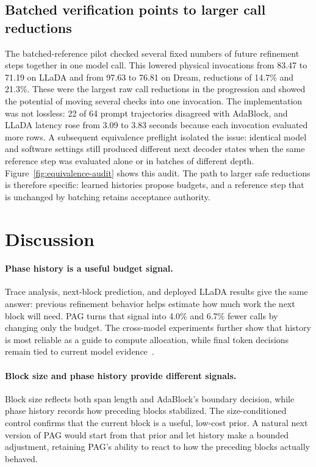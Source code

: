 \documentclass{article}
\begin{document}
\subsection{Batched verification points to larger call reductions}

The batched-reference pilot checked several fixed numbers of future refinement steps together in one model call. This lowered physical invocations from 83.47 to 71.19 on LLaDA and from 97.63 to 76.81 on Dream, reductions of 14.7\% and 21.3\%. These were the largest raw call reductions in the progression and showed the potential of moving several checks into one invocation. The implementation was not lossless: 22 of 64 prompt trajectories disagreed with AdaBlock, and LLaDA latency rose from 3.09 to 3.83 seconds because each invocation evaluated more rows. A subsequent equivalence preflight isolated the issue: identical model and software settings still produced different next decoder states when the same reference step was evaluated alone or in batches of different depth. Figure~\ref{fig:equivalence-audit} shows this audit. The path to larger safe reductions is therefore specific: learned histories propose budgets, and a reference step that is unchanged by batching retains acceptance authority.

\section{Discussion}
\label{sec:discussion}

\paragraph{Phase history is a useful budget signal.}
Trace analysis, next-block prediction, and deployed LLaDA results give the same answer: previous refinement behavior helps estimate how much work the next block will need. PAG turns that signal into 4.0\% and 6.7\% fewer calls by changing only the budget. The cross-model experiments further show that history is most reliable as a guide to compute allocation, while final token decisions remain tied to current model evidence~\citep{lu2026adablock,mohamed2025sched,mohamed2026less}.

\paragraph{Block size and phase history provide different signals.}
Block size reflects both span length and AdaBlock's boundary decision, while phase history records how preceding blocks stabilized. The size-conditioned control confirms that the current block is a useful, low-cost prior. A natural next version of PAG would start from that prior and let history make a bounded adjustment, retaining PAG's ability to react to how the preceding blocks actually behaved.
\end{document}
